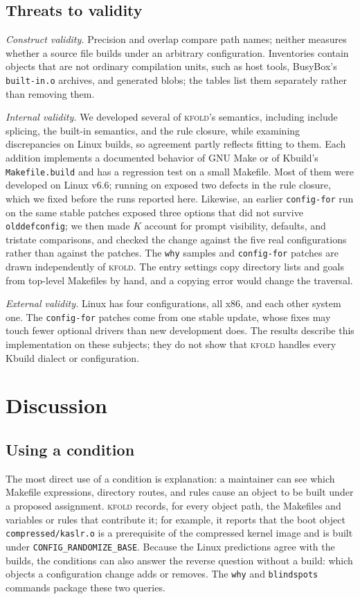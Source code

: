 \documentclass[acmsmall,screen,review]{acmart}
\newcommand{\tool}{\textsc{kfold}\xspace}
\begin{document}
\subsection{Threats to validity}
\label{sec:eval:threats}
\emph{Construct validity.} Precision and overlap compare path names; neither measures whether a source file builds under an arbitrary configuration. Inventories contain objects that are not ordinary compilation units, such as host tools, BusyBox's \texttt{built-in.o} archives, and generated blobs; the tables list them separately rather than removing them.

\emph{Internal validity.} We developed several of \tool's semantics, including include splicing, the built-in semantics, and the rule closure, while examining discrepancies on Linux builds, so agreement partly reflects fitting to them. Each addition implements a documented behavior of GNU Make or of Kbuild's \texttt{Makefile.build} and has a regression test on a small Makefile. Most of them were developed on Linux v6.6; running on \NLinuxVersion exposed two defects in the rule closure, which we fixed before the runs reported here. Likewise, an earlier \texttt{config-for} run on the same stable patches exposed three options that did not survive \texttt{olddefconfig}; we then made $K$ account for prompt visibility, defaults, and tristate comparisons, and checked the change against the five real configurations rather than against the patches. The \texttt{why} samples and \texttt{config-for} patches are drawn independently of \tool. The entry settings copy directory lists and goals from top-level Makefiles by hand, and a copying error would change the traversal.

\emph{External validity.} Linux has four configurations, all x86, and each other system one. The \texttt{config-for} patches come from one stable update, whose fixes may touch fewer optional drivers than new development does. The results describe this implementation on these subjects; they do not show that \tool handles every Kbuild dialect or configuration.

\section{Discussion}
\label{sec:discussion}

\subsection{Using a condition}
The most direct use of a condition is explanation: a maintainer can see which Makefile expressions, directory routes, and rules cause an object to be built under a proposed assignment. \tool records, for every object path, the Makefiles and variables or rules that contribute it; for example, it reports that the boot object \texttt{compressed/kaslr.o} is a prerequisite of the compressed kernel image and is built under \texttt{CONFIG\_RANDOMIZE\_BASE}. Because the Linux predictions agree with the builds, the conditions can also answer the reverse question without a build: which objects a configuration change adds or removes. The \texttt{why} and \texttt{blindspots} commands package these two queries.
\end{document}
